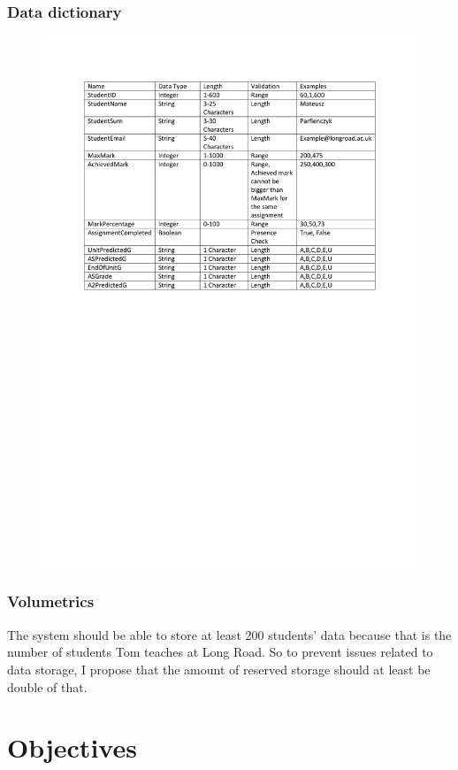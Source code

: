 \begin{algorithm}[H]
\subsubsection{Data dictionary}
\begin{figure}[H]
    \includegraphics[width=\textwidth]{./Analysis/images/DataDictionary.pdf}
\end{figure}

\subsubsection{Volumetrics}
The system should be able to store at least 200 students' data because that is the number of students Tom teaches at Long Road. 
So to prevent issues related to data storage, I propose that the amount of reserved storage should at least be double of that.

\section{Objectives}

\end{algorithm}
